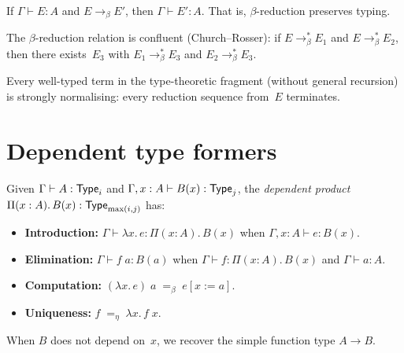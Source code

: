 \begin{theorem}
\label{thm:subject-reduction}
If $\Gamma \vdash E : A$ and $E \to_\beta E'$, then
$\Gamma \vdash E' : A$.  That is, $\beta$-reduction preserves typing.
\end{theorem}

\begin{theorem}[Confluence]
\label{thm:confluence}
The $\beta$-reduction relation is confluent (Church--Rosser): if
$E \to_\beta^* E_1$ and $E \to_\beta^* E_2$, then there exists~$E_3$
with $E_1 \to_\beta^* E_3$ and $E_2 \to_\beta^* E_3$.
\end{theorem}

\begin{theorem}
\label{thm:sn}
Every well-typed term in the type-theoretic fragment (without general
recursion) is strongly normalising: every reduction sequence from~$E$
terminates.
\end{theorem}

\section{Dependent type formers}
\label{sec:type-formers}

\begin{definition}
\label{def:pi}
Given $\Gamma \vdash A : \mathsf{Type}_i$ and
$\Gamma, x : A \vdash B(x) : \mathsf{Type}_j$, the \emph{dependent product}
$\Pi(x : A).\, B(x) : \mathsf{Type}_{\max(i,j)}$ has:
\begin{itemize}[nosep]
\item \textbf{Introduction:}
  $\Gamma \vdash \lambda x.\, e : \Pi(x:A).\, B(x)$
  when $\Gamma, x : A \vdash e : B(x)$.
\item \textbf{Elimination:}
  $\Gamma \vdash f\; a : B(a)$
  when $\Gamma \vdash f : \Pi(x:A).\, B(x)$ and $\Gamma \vdash a : A$.
\item \textbf{Computation:}
  $(\lambda x.\, e)\; a \;=_\beta\; e[x := a]$.
\item \textbf{Uniqueness:}
  $f \;=_\eta\; \lambda x.\, f\; x$.
\end{itemize}
When $B$ does not depend on~$x$, we recover the simple function type
$A \to B$.
\end{definition}

